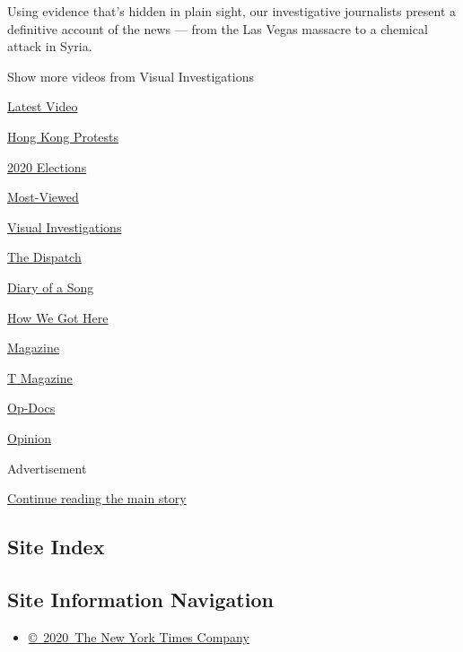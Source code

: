 Using evidence that's hidden in plain sight, our investigative
journalists present a definitive account of the news --- from the Las
Vegas massacre to a chemical attack in Syria.

Show more videos from Visual Investigations

\href{/video}{}

\href{/video/latest-video}{Latest Video}

\href{/video/hk-protest}{Hong Kong Protests}

\href{/video/2020-Elections}{2020 Elections}

\href{/video/Most-Viewed}{Most-Viewed}

\href{/video/investigations}{Visual Investigations}

\href{/video/on-the-ground}{The Dispatch}

\href{/video/diaryofasong}{Diary of a Song}

\href{/video/how-we-got-here}{How We Got Here}

\href{/video/magazine}{Magazine}

\href{/video/t-magazine}{T Magazine}

\href{/video/op-docs}{Op-Docs}

\href{/video/opinion}{Opinion}

Advertisement

\protect\hyperlink{after-bottom}{Continue reading the main story}

\hypertarget{site-index}{%
\subsection{Site Index}\label{site-index}}

\hypertarget{site-information-navigation}{%
\subsection{Site Information
Navigation}\label{site-information-navigation}}

\begin{itemize}
\tightlist
\item
  \href{https://help.nytimes3xbfgragh.onion/hc/en-us/articles/115014792127-Copyright-notice}{©~2020~The
  New York Times Company}
\end{itemize}

